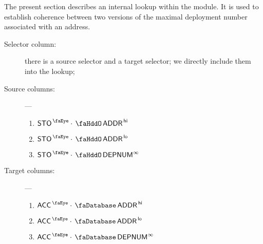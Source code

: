 The present section describes an internal lookup within the \hubMod{} module.
It is used to establish coherence between two versions of the maximal deployment number associated with an address.
\begin{description}
	\item[Selector column:]
		there is a source selector and a target selector;
		we directly include them into the lookup;
	\item[Source columns:] ---
		\begin{multicols}{3}
			\begin{enumerate}
				\item $\peekStorage \cdot \stoAddressHi$
				\item $\peekStorage \cdot \stoAddressLo$
				\item $\peekStorage \cdot \stoDeploymentNumber^\infty$
			\end{enumerate}
		\end{multicols}
	\item[Target columns:] ---
		\begin{multicols}{3}
			\begin{enumerate}
				\item $\peekAccount \cdot \accAddressHi$
				\item $\peekAccount \cdot \accAddressLo$
				\item $\peekAccount \cdot \accDepNumber^\infty$
			\end{enumerate}
		\end{multicols}
\end{description}
